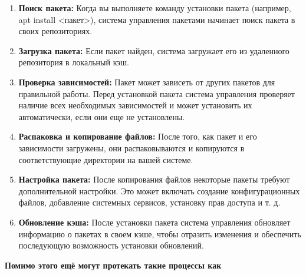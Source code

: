 \documentclass[oneside, final, 14pt]{extreport} %
\begin{document}
\begin{enumerate}
    \item \textbf{Поиск пакета:} Когда вы выполняете команду установки пакета (например, apt install <пакет>), система управления пакетами начинает поиск пакета в своих репозиториях.
    \item \textbf{Загрузка пакета:} Если пакет найден, система загружает его из удаленного репозитория в локальный кэш.
    \item \textbf{Проверка зависимостей:} Пакет может зависеть от других пакетов для правильной работы. Перед установкой пакета система управления проверяет наличие всех необходимых зависимостей и может установить их автоматически, если они еще не установлены.
    \item \textbf{Распаковка и копирование файлов:} После того, как пакет и его зависимости загружены, они распаковываются и копируются в соответствующие директории на вашей системе.
    \item \textbf{Настройка пакета:} После копирования файлов некоторые пакеты требуют дополнительной настройки. Это может включать создание конфигурационных файлов, добавление системных сервисов, установку прав доступа и т. д.
    \item \textbf{Обновление кэша:} После установки пакета система управления обновляет информацию о пакетах в своем кэше, чтобы отразить изменения и обеспечить последующую возможность установки обновлений.
\end{enumerate}

\textbf{Помимо этого ещё могут протекать такие процессы как}
\end{document}
